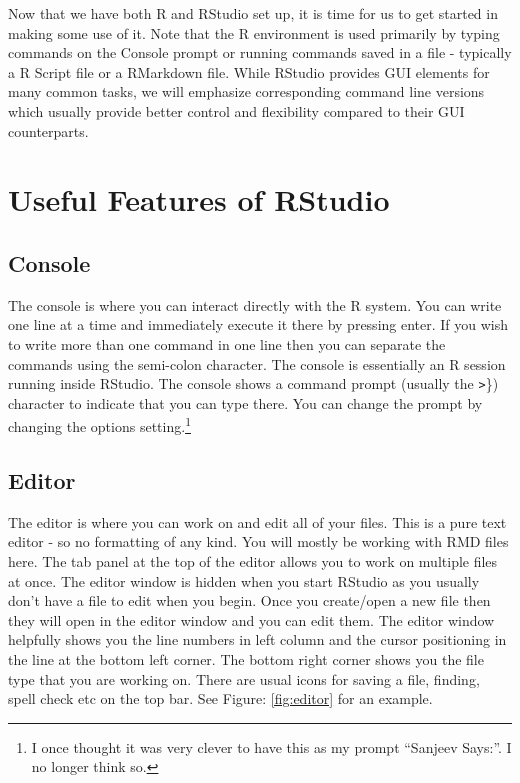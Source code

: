 \documentclass[]{krantz}
\begin{document}
Now that we have both R and RStudio set up, it is time for us to get
started in making some use of it. Note that the R environment is used
primarily by typing commands on the Console prompt or running commands
saved in a file - typically a R Script file or a RMarkdown file. While
RStudio provides GUI elements for many common tasks, we will emphasize
corresponding command line versions which usually provide better control
and flexibility compared to their GUI counterparts.

\section{Useful Features of RStudio}\label{useful-features-of-rstudio}

\subsection{Console}\label{console}

The console is where you can interact directly with the R system. You
can write one line at a time and immediately execute it there by
pressing enter. If you wish to write more than one command in one line
then you can separate the commands using the semi-colon character. The
console is essentially an R session running inside RStudio. The console
shows a command prompt (usually the \texttt{\textgreater{}}\}) character
to indicate that you can type there. You can change the prompt by
changing the options setting.\footnote{I once thought it was very clever
  to have this as my prompt ``Sanjeev Says:''. I no longer think so.}

\subsection{Editor}\label{editor}

The editor is where you can work on and edit all of your files. This is
a pure text editor - so no formatting of any kind. You will mostly be
working with RMD files here. The tab panel at the top of the editor
allows you to work on multiple files at once. The editor window is
hidden when you start RStudio as you usually don't have a file to edit
when you begin. Once you create/open a new file then they will open in
the editor window and you can edit them. The editor window helpfully
shows you the line numbers in left column and the cursor positioning in
the line at the bottom left corner. The bottom right corner shows you
the file type that you are working on. There are usual icons for saving
a file, finding, spell check etc on the top bar. See Figure:
\ref{fig:editor} for an example.
\end{document}

